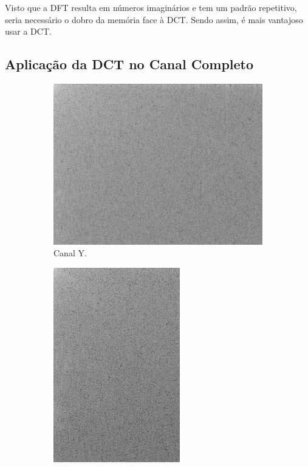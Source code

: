 \documentclass[a4paper, 12pt]{article}
\begin{document}
    Visto que a DFT resulta em números imaginários e tem um padrão repetitivo, seria necessário o
    dobro da memória face à DCT. Sendo assim, é mais vantajoso usar a DCT.
    
    \subsection{Aplicação da DCT no Canal Completo}        
        \begin{figure}[H]
            \ContinuedFloat
            \begin{subfigure}{0.3\textwidth}
                \centering
                \includegraphics[scale=0.5]{resources/DCT/Ydct.png}
                \caption{ Canal Y.}
            \end{subfigure}
            \hfill
            \begin{subfigure}{0.3\textwidth}
                \centering 
                \includegraphics[scale=0.5]{resources/DCT/CBdct.png}

\end{subfigure}
\end{figure}
\end{document}
